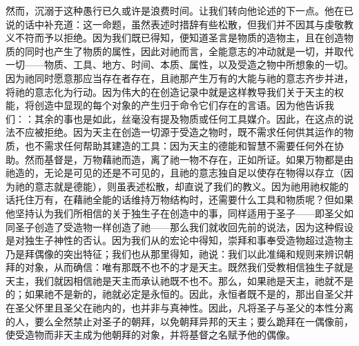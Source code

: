 然而，沉溺于这种愚行已久或许是浪费时间。让我们转向他论述的下一点。他在已说的话中补充道：这一命题，虽然表述时措辞有些松散，但我们并不因其与虔敬教义不符而予以拒绝。因为我们既已得知，便知道圣言是物质的造物主，且在创造物质的同时也产生了物质的属性，因此对祂而言，全能意志的冲动就是一切，并取代一切——物质、工具、地方、时间、本质、属性，以及受造之物中所想象的一切。因为祂同时愿意那应当存在者存在，且祂那产生万有的大能与祂的意志齐步并进，将祂的意志化为行动。因为伟大的在创造记录中就是这样教导我们关于天主的权能，将创造中显现的每个对象的产生归于命令它们存在的言语。因为他告诉我们：：其余的事也是如此，丝毫没有提及物质或任何工具媒介。因此，在这点的说法不应被拒绝。因为天主在创造一切源于受造之物时，既不需求任何供其运作的物质，也不需求任何帮助其建造的工具：因为天主的德能和智慧不需要任何外在协助。然而基督是，万物藉祂而造，离了祂一物不存在，正如所证。如果万物都是由祂造的，无论是可见的还是不可见的，且祂的意志独自足以使存在物得以存立（因为祂的意志就是德能），则虽表述松散，却直说了我们的教义。因为祂用祂权能的话托住万有，在藉祂全能的话维持万物结构时，还需要什么工具和物质呢？但如果他坚持认为我们所相信的关于独生子在创造中的事，同样适用于圣子——即圣父如同圣子创造了受造物一样创造了祂——那么我们就收回先前的说法，因为这种假设是对独生子神性的否认。因为我们从的宏论中得知，崇拜和事奉受造物超过造物主乃是拜偶像的突出特征；我们也从那里得知，祂说：我们以此准绳和规则来辨识朝拜的对象，从而确信：唯有那既不也不的才是天主。既然我们受教相信独生子就是天主，我们就因相信祂是天主而承认祂既不也不。那么，如果祂是天主，祂就不是的；如果祂不是新的，祂就必定是永恒的。因此，永恒者既不是的，那出自圣父并在圣父怀里且圣父在祂内的，也并非与真神性。因此，凡将圣子与圣父的本性分离的人，要么全然禁止对圣子的朝拜，以免朝拜异邦的天主；要么跪拜在一偶像前，使受造物而非天主成为他朝拜的对象，并将基督之名赋予他的偶像。\par

